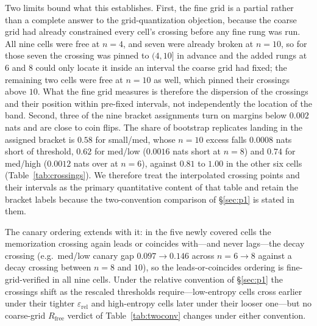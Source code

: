 \documentclass[11pt]{article}
\begin{document}
Two limits bound what this establishes. First, the fine grid is a partial rather
than a complete answer to the grid-quantization objection, because the coarse
grid had already constrained every cell's crossing before any fine rung was run.
All nine cells were free at $n{=}4$, and seven were already broken at $n{=}10$,
so for those seven the crossing was pinned to $(4, 10]$ in advance and the added
rungs at $6$ and $8$ could only locate it inside an interval the coarse grid had
fixed; the remaining two cells were free at $n{=}10$ as well, which pinned their
crossings above $10$. What the fine grid measures is therefore the dispersion of
the crossings and their position within pre-fixed intervals, not independently
the location of the band. Second, three of the nine bracket assignments turn on
margins below $0.002$ nats and are close to coin flips. The share of bootstrap
replicates landing in the assigned bracket is $0.58$ for small/med, whose
$n{=}10$ excess falls $0.0008$ nats short of threshold, $0.62$ for med/low
($0.0016$ nats short at $n{=}8$) and $0.74$ for med/high ($0.0012$ nats over at
$n{=}6$), against $0.81$ to $1.00$ in the other six cells
(Table~\ref{tab:crossings}). We therefore treat the interpolated crossing points
and their intervals as the primary quantitative content of that table and retain
the bracket labels because the two-convention comparison of \S\ref{sec:p1} is
stated in them.

The
canary ordering extends with it: in the five newly covered cells the memorization
crossing again leads or coincides with---and never lags---the decay crossing (e.g.\
med/low canary gap $0.097 \to 0.146$ across $n{=}6 \to 8$ against a decay crossing
between $n{=}8$ and $10$), so the leads-or-coincides ordering is fine-grid-verified in
all nine cells. Under the relative convention of \S\ref{sec:p1} the crossings shift as
the rescaled thresholds require---low-entropy cells cross earlier under their tighter
$\varepsilon_{\mathrm{rel}}$ and high-entropy cells later under their looser one---but
no coarse-grid $R_{\mathrm{free}}$ verdict of Table~\ref{tab:twoconv} changes under
either convention.
\end{document}
